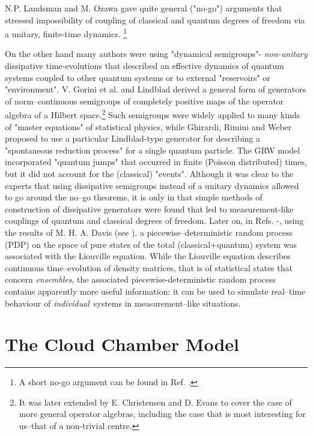 \documentclass[12pt]{article}
\begin{document}
N.P. Landsman \cite{lan1} and M. Ozawa \cite{oza1} gave quite general
("no-go") arguments that stressed impossibility of coupling of classical
and quantum degrees of freedom via a unitary, finite-time dynamics.
\footnote{A short no-go argument can be found in Ref. \cite{jad1}.}

On the other hand many authors were using "dynamical semigroups"-{\sl
non-unitary} dissipative time-evolutions that described an effective
dynamics of quantum systems coupled to other quantum systems or to external
"reservoirs" or "environment". V. Gorini et al. \cite{gor1} and Lindblad
\cite{lin1} derived a general form of generators of norm--continuous
semigroups of completely positive maps of the operator algebra of a Hilbert
space.\footnote{It was later extended by E. Christensen and D. Evans
\cite{chri1} to cover the case of more general operator algebras, including
the case that is most interesting for us--that of a non-trivial centre.}
Such semigroups were widely applied to many kinds of "master equations" of
statistical physics, while Ghirardi, Rimini and Weber \cite{ghi1} proposed
to use a particular Lindblad-type generator for describing a "spontaneous
reduction process" for a single quantum particle. The GRW model
incorporated "quantum jumps" that occurred in finite (Poisson distributed)
times, but it did not account for the (classical) "events". Although it was
clear to the experts that using dissipative semigroups instead of a unitary
dynamics allowed to go around the no--go theorems, it is only in
\cite{bla1} that simple methods of construction of dissipative generators
were found that led to measurement-like couplings of quantum and classical
degrees of freedom. Later on, in Refs. \cite{bla2}-\cite{jad1}, using the
results of M. H. A. Davis (see \cite{davmha1,davmha2}), a
piecewise--deterministic random process (PDP) on the space of pure states
of the total (classical+quantum) system was associated with the Liouville
equation. While the Liouville equation describes continuous time--evolution
of density matrices, that is of statistical states that concern {\sl
ensembles}, the associated piecewise-deterministic random process contains
apparently more useful information: it can be used to simulate real--time
behaviour of {\sl individual}\, systems in measurement--like situations.

\section{The Cloud Chamber Model}\label{cloud}
\end{document}
